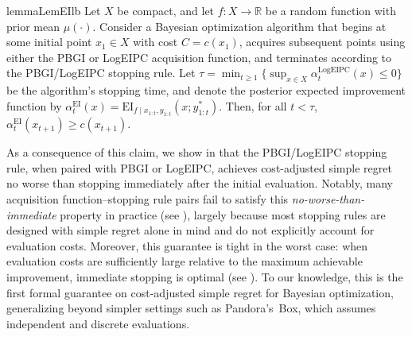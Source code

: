 
\begin{restatable}{lemma}{LemEIlb} \label{lem:EI_lower_bound}
Let $X$ be compact, and let $f : X \to \mathbb{R}$ be a random function with prior mean $\mu(\cdot)$. %
Consider a Bayesian optimization algorithm that begins at some initial point $x_1\in X$ with cost $C = c(x_1)$, acquires subsequent points using either the PBGI or LogEIPC acquisition function, and terminates according to the PBGI/LogEIPC stopping rule.
Let $\tau = \min_{t \geq 1} \{\sup_{x \in X} \alpha_{t}^{\mathrm{LogEIPC}}(x) \leq 0\}$ be the algorithm's stopping time, and denote the posterior expected improvement function by $\alpha_{t}^{\mathrm{EI}}(x) = \mathrm{EI}_{f \mid x_{1:t}, y_{1:t}}\left(x; y^*_{1:t}\right)$. Then, for all $t < \tau$, $\alpha_{t}^{\mathrm{EI}}(x_{t+1})\ge c(x_{t+1})$.
\end{restatable}
 
As a consequence of this claim, we show in  that the PBGI/LogEIPC stopping rule, when paired with PBGI or LogEIPC, achieves cost-adjusted simple regret no worse than stopping immediately after the initial evaluation.
Notably, many acquisition function–stopping rule pairs fail to satisfy this \emph{no-worse-than-immediate} property in practice (see ), largely because most stopping rules are designed with simple regret alone in mind and do not explicitly account for evaluation costs.
Moreover, this guarantee is tight in the worst case: when evaluation costs are sufficiently large relative to the maximum achievable improvement, immediate stopping is optimal (see ).
To our knowledge, this is the first formal guarantee on cost-adjusted simple regret for Bayesian optimization, generalizing beyond simpler settings such as Pandora’s~Box, which assumes independent and discrete evaluations.

